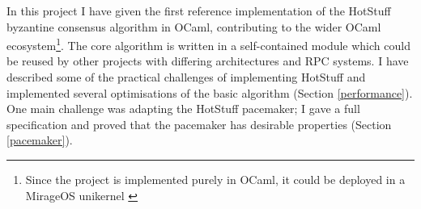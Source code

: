 




In this project I have given the first reference implementation of the HotStuff byzantine consensus algorithm in OCaml, contributing to the wider OCaml ecosystem\footnote{Since the project is implemented purely in OCaml, it could be deployed in a MirageOS unikernel \cite{mirage}}. The core algorithm is written in a self-contained module which could be reused by other projects with differing architectures and RPC systems. I have described some of the practical challenges of implementing HotStuff and implemented several optimisations of the basic algorithm (Section \ref{performance}). One main challenge was adapting the HotStuff pacemaker; I gave a full specification and proved that the pacemaker has desirable properties (Section \ref{pacemaker}).


